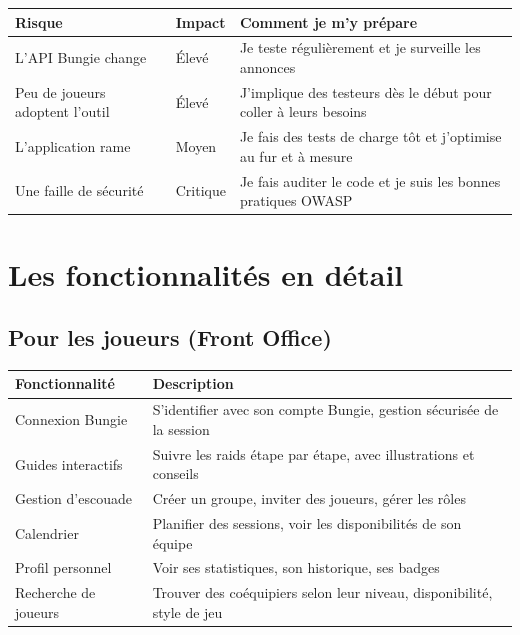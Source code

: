 \begin{center}
    \begin{tabular}{|p{3.5cm}|p{4cm}|p{4cm}|}
        \hline
        \textbf{Risque} & \textbf{Impact} & \textbf{Comment je m'y prépare} \\
        \hline
        L'API Bungie change & Élevé & Je teste régulièrement et je surveille les annonces \\
        \hline
    Peu de joueurs adoptent l'outil & Élevé & J'implique des testeurs dès le début pour coller à leurs besoins \\
        \hline
        L'application rame & Moyen & Je fais des tests de charge tôt et j'optimise au fur et à mesure \\
        \hline
        Une faille de sécurité & Critique & Je fais auditer le code et je suis les bonnes pratiques OWASP \\
        \hline
    \end{tabular}
\end{center}

\section{Les fonctionnalités en détail}

\subsection*{Pour les joueurs (Front Office)}

\begin{center}
    \begin{tabular}{|p{3.5cm}|p{6cm}|}
        \hline
        \textbf{Fonctionnalité} & \textbf{Description} \\
        \hline
        Connexion Bungie & S'identifier avec son compte Bungie, gestion sécurisée de la session \\
        \hline
        Guides interactifs & Suivre les raids étape par étape, avec illustrations et conseils \\
        \hline
        Gestion d'escouade & Créer un groupe, inviter des joueurs, gérer les rôles \\
        \hline
        Calendrier & Planifier des sessions, voir les disponibilités de son équipe \\
        \hline
        Profil personnel & Voir ses statistiques, son historique, ses badges \\
        \hline
        Recherche de joueurs & Trouver des coéquipiers selon leur niveau, disponibilité, style de jeu \\
        \hline
    \end{tabular}
\end{center}

